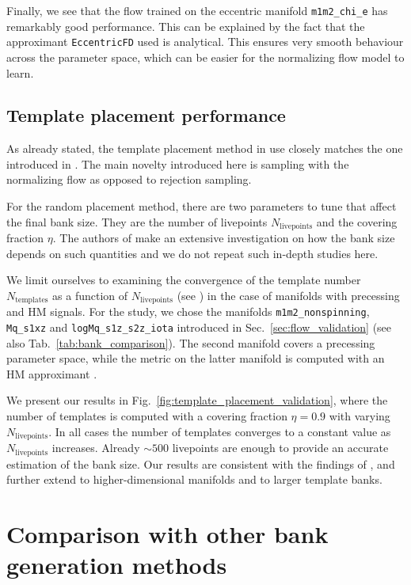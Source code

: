 \documentclass[twocolumn,showpacs,preprintnumbers,nofootinbib,prd,
superscriptaddress,10pt]{revtex4-2}
\begin{document}
Finally, we see that the flow trained on the eccentric manifold \texttt{m1m2\_chi\_e} has remarkably good performance. This can be explained by the fact that the approximant \texttt{EccentricFD} \cite{lalsuite} used is analytical. This ensures very smooth behaviour across the parameter space, which can be easier for the normalizing flow model to learn.


\subsection{Template placement performance} \label{sec:template_placement}

As already stated, the template placement method in use closely matches the one introduced in \cite{Coogan:2022qxs}.
The main novelty introduced here is sampling with the normalizing flow as opposed to rejection sampling.

For the random placement method, there are two parameters to tune that affect the final bank size. They are the number of livepoints $N_\text{livepoints}$ and the covering fraction $\eta$.
The authors of \cite{Coogan:2022qxs} make an extensive investigation on how the bank size depends on such quantities and we do not repeat such in-depth studies here.

We limit ourselves to examining the convergence of the template number $N_\text{templates}$ as a function of $N_\text{livepoints}$ (see \cite[Fig.~4 (right)]{Coogan:2022qxs}) in the case of manifolds with precessing and HM signals.
For the study, we chose the manifolds \texttt{m1m2\_nonspinning}, \texttt{Mq\_s1xz} and \texttt{logMq\_s1z\_s2z\_iota} introduced in Sec.~\ref{sec:flow_validation} (see also Tab.~\ref{tab:bank_comparison}). The second manifold covers a precessing parameter space, while the metric on the latter manifold is computed with an HM approximant \cite{Garcia-Quiros:2020qpx}.

We present our results in Fig.~\ref{fig:template_placement_validation}, where the number of templates is computed with a covering fraction $\eta = 0.9$ with varying $N_\text{livepoints}$.
In all cases the number of templates converges to a constant value as $N_\text{livepoints}$ increases. Already $\sim 500$ livepoints are enough to provide an accurate estimation of the bank size.
Our results are consistent with the findings of \cite{Coogan:2022qxs}, and further extend to higher-dimensional manifolds and to larger template banks.

\section{Comparison with other bank generation methods} \label{sec:other_methods}
\end{document}
